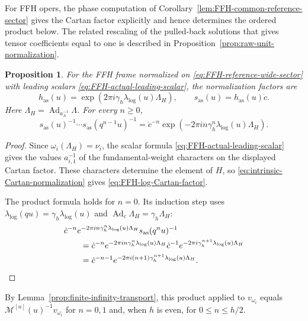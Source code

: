 \documentclass[11pt,leqno]{amsart}
\numberwithin{equation}{section}
\theoremstyle{plain}
\newtheorem{proposition}[theorem]{Proposition}
\theoremstyle{definition}
\theoremstyle{plain}
\theoremstyle{definition}
\theoremstyle{remark}
\begin{document}
For FFH opers, the phase computation of Corollary~\ref{lem:FFH-common-reference-sector} gives the Cartan factor explicitly and hence determines the ordered product below.  The related rescaling of the pulled-back solutions that gives tensor coefficients equal to one is described in Proposition~\ref{prop:raw-unit-normalization}.

\begin{proposition}\label{prop:FFH-phase-transport}
For the FFH frame normalized on \eqref{eq:FFH-reference-wide-sector} with leading scalars \eqref{eq:FFH-actual-leading-scalar}, the normalization factors are
\begin{equation}\label{eq:FFH-log-Cartan-factor}
 h_{\mathrm{as}}(u)=\exp(2\pi i\gamma_h\lambda_{\log}(u)\Lambda_H),\qquad
 s_{\mathrm{as}}(u)=h_{\mathrm{as}}(u)\dot c.
\end{equation}
Here $\Lambda_H=\operatorname{Ad}_{a_\Lambda^{-1}}\Lambda$.  For every $n\ge0$,
\begin{equation}\label{eq:FFH-log-full-leading-orbit}
 s_{\mathrm{as}}(u)^{-1}\cdots s_{\mathrm{as}}(q^{n-1}u)^{-1}
 =\dot c^{-n}\exp(-2\pi i n\gamma_h^n\lambda_{\log}(u)\Lambda_H).
\end{equation}
\end{proposition}
\begin{proof}
Since $\omega_i(\Lambda_H)=\nu_i$, the scalar formula \eqref{eq:FFH-actual-leading-scalar} gives the values $a_{i,1}^{-1}$ of the fundamental-weight characters on the displayed Cartan factor.  These characters determine the element of $H$, so \eqref{eq:intrinsic-Cartan-normalization} gives \eqref{eq:FFH-log-Cartan-factor}.

The product formula holds for $n=0$.  Its induction step uses $\lambda_{\log}(qu)=\gamma_h\lambda_{\log}(u)$ and $\operatorname{Ad}_{\dot c}\Lambda_H=\gamma_h\Lambda_H$:
\begin{align*}
 &\dot c^{-n}e^{-2\pi i n\gamma_h^n\lambda_{\log}(u)\Lambda_H}
     s_{\mathrm{as}}(q^nu)^{-1}\\
 &\qquad=\dot c^{-n}e^{-2\pi i n\gamma_h^n\lambda_{\log}(u)\Lambda_H}
     \dot c^{-1}e^{-2\pi i\gamma_h^{n+1}\lambda_{\log}(u)\Lambda_H}\\
 &\qquad=\dot c^{-n-1}e^{-2\pi i(n+1)\gamma_h^{n+1}\lambda_{\log}(u)\Lambda_H}.
 \qedhere
\end{align*}
\end{proof}
By Lemma~\ref{prop:finite-infinity-transport}, this product applied to $v_{\omega_i}$ equals $\mathscr M^{[n]}(u)^{-1}v_{\omega_i}$ for $n=0,1$ and, when $h$ is even, for $0\le n\le h/2$.
\end{document}
